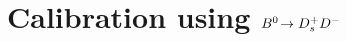 
\section[Calibration using \texorpdfstring{$\BdToDsD$}{Bd2DsD}]{Calibration using \texorpdfstring{$\BdToDsD$}{Bd2DsD}}
\label{sec:tagging:dsdcalibration}